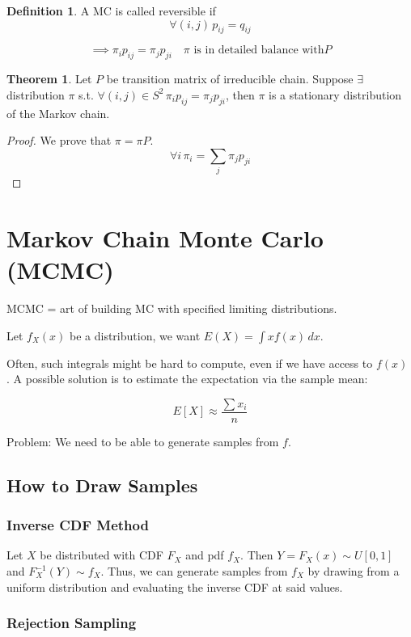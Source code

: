\documentclass{article}
\theoremstyle{definition}
\newtheorem{defn}{Definition}[section]
\newtheorem{theorem}{Theorem}[section]
\begin{document}
\begin{defn}
A MC is called reversible if
$$
\forall (i,j) \, p_{ij} = q_{ij}
$$
\end{defn}

$$
\implies \pi_i p_{ij} = \pi_j p_{ji} \quad \pi \text{ is in detailed balance with} P
$$

\begin{theorem}
Let $P$ be transition matrix of irreducible chain. Suppose $\exists$ distribution $\pi$ s.t. $\forall (i,j) \in S^2 \, \pi_i p_{ij} = \pi_j p_{ji}$,
then $\pi$ is a stationary distribution of the Markov chain.

\begin{proof}
We prove that $\pi = \pi P$.
$$
\forall i \, \pi_i = \sum_j \pi_j p_{ji}
$$
\end{proof}
\end{theorem}

\section{Markov Chain Monte Carlo (MCMC)}
MCMC = art of building MC with specified limiting distributions.

Let $f_X(x)$ be a distribution, we want $E(X) = \int x f(x) \, dx$.

Often, such integrals might be hard to compute, even if we have access to $f(x)$
. A possible solution is to estimate the expectation via the sample mean:

$$
E[X] \approx \frac{\sum x_i}{n}
$$

Problem: We need to be able to generate samples from $f$.

\subsection{How to Draw Samples}

\subsubsection{Inverse CDF Method}
Let $X$ be distributed with CDF $F_X$ and pdf $f_X$. Then $Y = F_X(x) \sim U[0,1]$ and
$F_X^{-1}(Y) \sim f_X$. Thus, we can generate samples from $f_X$ by drawing from a
uniform distribution and evaluating the inverse CDF at said values.

\subsubsection{Rejection Sampling}
\end{document}
